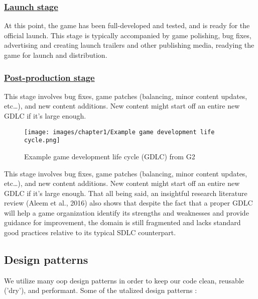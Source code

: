 \documentclass[../main.tex]{subfiles}
\begin{document}
\subsubsection*{\underline{Launch stage}}
At this point, the game has been full-developed and tested, and is ready for the official launch. This stage is typically accompanied by game polishing, bug fixes, advertising and creating launch trailers and other publishing media, readying the game for launch and distribution.

\subsubsection*{\underline{Post-production stage}}
This stage involves bug fixes, game patches (balancing, minor content updates, etc…), and new content additions. New content might start off an entire new GDLC if it's large enough.



\begin{figure}[!ht]
\centering
\texttt{[image: images/chapter1/Example game development life cycle.png]}
\caption{Example game development life cycle (GDLC) from G2}
\label{fig:Example game development life cycle (GDLC)}
\end{figure}
This stage involves bug fixes, game patches (balancing, minor content updates, etc…), and new content additions. New content might start off an entire new GDLC if it's large enough.
That all being said, an insightful research literature review (Aleem et al., 2016) \cite{11} also shows that despite the fact that a proper GDLC will help a game organization identify its strengths and weaknesses and provide guidance for improvement, the domain is still fragmented and lacks standard good practices relative to its typical SDLC counterpart. 
\newpage

\subsection{Design patterns}
We utilize many \acrshort{oop} design patterns in order to keep our code clean, reusable ('dry'), and performant. Some of the utalized design patterns \cite{32}:
\end{document}
